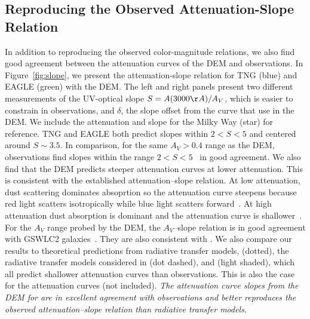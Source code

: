 \subsection{Reproducing the Observed Attenuation-Slope Relation}
In addition to reproducing the observed color-magnitude relations, we
also find good agreement between the attenuation curves of the DEM and
observations. In Figure~\ref{fig:slope}, we present the attenuation-slope
relation for TNG (blue) and EAGLE (green) with the DEM.
The left and right panels present two different measurements of the UV-optical slope $S =
A(3000\AA)/A_V$, which is easier to constrain in observations, and $\delta$,
the slope offset from the \cite{calzetti2001} curve that use in the DEM. 
We include the attenuation and slope for the Milky Way (star) for reference.
TNG and EAGLE both predict slopes within $2 < S < 5$ and centered around $S\sim
3.5$. In comparison, for the same $A_V > 0.4$ range as the DEM, observations 
find slopes within the range $2 < S < 5$~\citep{calzetti2000, burgarella2005, johnson2007,
conroy2010b, wild2011, battisti2016, battisti2017, leja2017, salim2018} in good
agreement. We also find that the DEM predicts steeper attenuation curves at 
lower attenuation. This is consistent with the established attenuation--slope
relation. At low attenuation, dust scattering dominates absoprtion so the 
attenuation curve steepens because red light scatters isotropically while blue light
scatters forward~\citep{gordon1994, witt2000, draine2003}. %
At high attenuation dust absorption is dominant and the attenuation curve is
shallower~\citep{chevallard2013}. For the $A_V$ range probed by the DEM, the
$A_V$--slope relation is in good agreement with GSWLC2 galaxies~\citep[black shaded][]{salim2020}.
They are also consistent with \cite{leja2017}. We also compare our results to
theoretical predictions from radiative transfer models, \cite{inoue2005}
(dotted), the radiative transfer models considered in \cite{chevallard2013}
(dot dashed), and \cite{trayford2020} (light shaded), which all predict shallower 
attenuation curves than observations. This is also the case for the
\cite{narayanan2018} attenuation curves (not included). 
\emph{The attenuation curve slopes from the DEM for are in excellent
agreement with observations and better reproduces the observed
attenuation--slope relation than radiative transfer models.}


